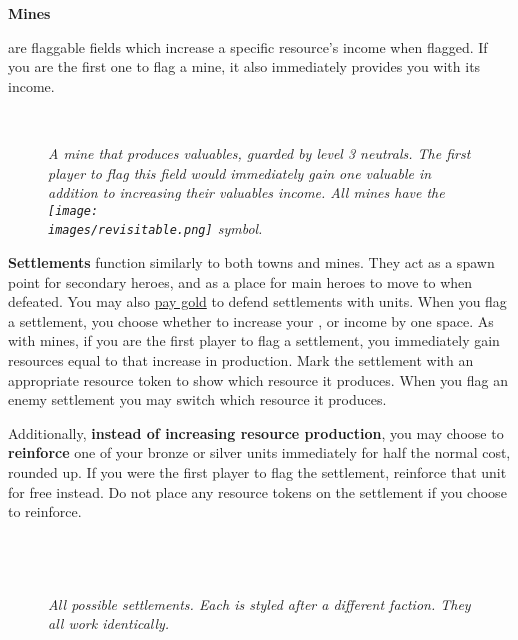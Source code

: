 \hypertarget{Mines}{\textbf{Mines}} are flaggable fields which increase a specific resource's income when flagged.
If you are the first one to flag a mine, it also immediately provides you with its income.

\begin{figure}[h]
\centering
{}\\
\caption{\textit{A mine that produces valuables, guarded by level 3 neutrals.
  The first player to flag this field would immediately gain one valuable in addition to increasing their valuables income.
  All mines have the \texttt{[image: \\images/revisitable.png]} symbol.}}
\end{figure}

\textbf{Settlements} function similarly to both towns and mines.
They act as a spawn point for secondary heroes, and as a place for main heroes to move to when defeated.
You may also \hyperlink{Town}{pay gold} to defend settlements with units.
When you flag a settlement, you choose whether to increase your ,  or  income by one space.
As with mines, if you are the first player to flag a settlement, you immediately gain resources equal to that increase in production.
Mark the settlement with an appropriate resource token to show which resource it produces.
When you flag an enemy settlement you may switch which resource it produces.\par
Additionally, \textbf{instead of increasing resource production}, you may choose to \textbf{reinforce} one of your bronze or silver units immediately for half the normal cost, rounded up.
If you were the first player to flag the settlement, reinforce that unit for free instead.
Do not place any resource tokens on the settlement if you choose to reinforce.
\begin{figure}[h]
\centering
{}\hfill%
\hfill%
\\
\vspace{4pt}
\hfill%
\hfill%
\\
\vspace{4pt}
\\%
\vspace{4pt}
\textit{All possible settlements.
  Each is styled after a different faction.
  They all work identically.}
\end{figure}
\bigbreak

